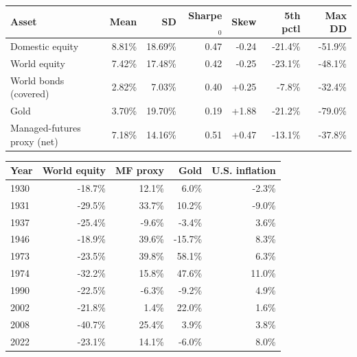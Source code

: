 \setlength{\tabcolsep}{5pt}
\begin{tabular}{lrrrrrr}
\toprule
Asset & Mean & SD & Sharpe$_0$ & Skew & 5th pctl & Max DD \\
\midrule
Domestic equity & 8.81\% & 18.69\% & 0.47 & -0.24 & -21.4\% & -51.9\% \\
World equity & 7.42\% & 17.48\% & 0.42 & -0.25 & -23.1\% & -48.1\% \\
World bonds (covered) & 2.82\% & 7.03\% & 0.40 & +0.25 & -7.8\% & -32.4\% \\
Gold & 3.70\% & 19.70\% & 0.19 & +1.88 & -21.2\% & -79.0\% \\
Managed-futures proxy (net) & 7.18\% & 14.16\% & 0.51 & +0.47 & -13.1\% & -37.8\% \\
\bottomrule
\end{tabular}

\par\bigskip

\begin{tabular}{lrrrr}
\toprule
Year & World equity & MF proxy & Gold & U.S. inflation \\
\midrule
1930 & -18.7\% & 12.1\% & 6.0\% & -2.3\% \\
1931 & -29.5\% & 33.7\% & 10.2\% & -9.0\% \\
1937 & -25.4\% & -9.6\% & -3.4\% & 3.6\% \\
1946 & -18.9\% & 39.6\% & -15.7\% & 8.3\% \\
1973 & -23.5\% & 39.8\% & 58.1\% & 6.3\% \\
1974 & -32.2\% & 15.8\% & 47.6\% & 11.0\% \\
1990 & -22.5\% & -6.3\% & -9.2\% & 4.9\% \\
2002 & -21.8\% & 1.4\% & 22.0\% & 1.6\% \\
2008 & -40.7\% & 25.4\% & 3.9\% & 3.8\% \\
2022 & -23.1\% & 14.1\% & -6.0\% & 8.0\% \\
\bottomrule
\end{tabular}
